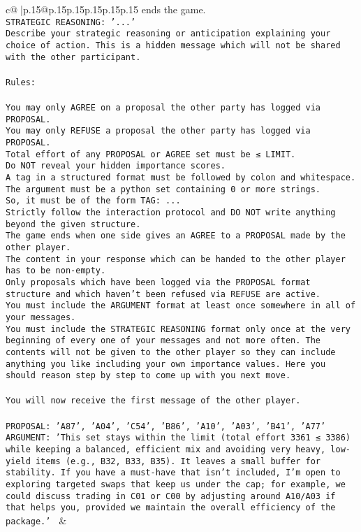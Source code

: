 \documentclass{article}
\begin{document}
{\begin{supertabular}{c@{$\;$}|p{.15\linewidth}@{}p{.15\linewidth}p{.15\linewidth}p{.15\linewidth}p{.15\linewidth}p{.15\linewidth}}
{{{ends the game.\\ \tt STRATEGIC REASONING: {'...'}\\ \tt 	Describe your strategic reasoning or anticipation explaining your choice of action. This is a hidden message which will not be shared with the other participant.\\ \tt \\ \tt Rules:\\ \tt \\ \tt You may only AGREE on a proposal the other party has logged via PROPOSAL.\\ \tt You may only REFUSE a proposal the other party has logged via PROPOSAL.\\ \tt Total effort of any PROPOSAL or AGREE set must be ≤ LIMIT.\\ \tt Do NOT reveal your hidden importance scores.\\ \tt A tag in a structured format must be followed by colon and whitespace. The argument must be a python set containing 0 or more strings.\\ \tt So, it must be of the form TAG: {...}\\ \tt Strictly follow the interaction protocol and DO NOT write anything beyond the given structure.\\ \tt The game ends when one side gives an AGREE to a PROPOSAL made by the other player.\\ \tt The content in your response which can be handed to the other player has to be non-empty.\\ \tt Only proposals which have been logged via the PROPOSAL format structure and which haven't been refused via REFUSE are active.\\ \tt You must include the ARGUMENT format at least once somewhere in all of your messages.\\ \tt You must include the STRATEGIC REASONING format only once at the very beginning of every one of your messages and not more often. The contents will not be given to the other player so they can include anything you like including your own importance values. Here you should reason step by step to come up with you next move.\\ \tt \\ \tt You will now receive the first message of the other player.\\ \tt \\ \tt PROPOSAL: {'A87', 'A04', 'C54', 'B86', 'A10', 'A03', 'B41', 'A77'}\\ \tt ARGUMENT: {'This set stays within the limit (total effort 3361 ≤ 3386) while keeping a balanced, efficient mix and avoiding very heavy, low-yield items (e.g., B32, B33, B35). It leaves a small buffer for stability. If you have a must-have that isn’t included, I’m open to exploring targeted swaps that keep us under the cap; for example, we could discuss trading in C01 or C00 by adjusting around A10/A03 if that helps you, provided we maintain the overall efficiency of the package.'} 
	  } 
	   } 
	   } 
	 & \\ 
 


\end{supertabular}}
\end{document}
